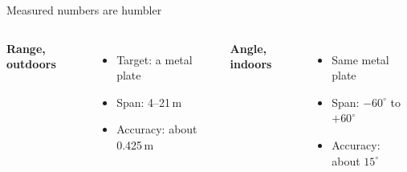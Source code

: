 \begin{frame}{Measured numbers are humbler}
  \vspace{0.5em}
  \begin{columns}[T,onlytextwidth]
      \large\textbf{\textcolor{ranblue}{Range, outdoors}}

      \vspace{0.5em}
      \small
      \begin{itemize}\itemsep4pt
        \item Target: a metal plate
        \item Span: 4--21\,m
        \item Accuracy: about 0.425\,m
      \end{itemize}
      \large\textbf{\textcolor{coreorange}{Angle, indoors}}

      \vspace{0.5em}
      \small
      \begin{itemize}\itemsep4pt
        \item Same metal plate
        \item Span: $-60^\circ$ to $+60^\circ$
        \item Accuracy: about $15^\circ$
      \end{itemize}
  \end{columns}

  \vspace{0.9em}
\end{frame}

